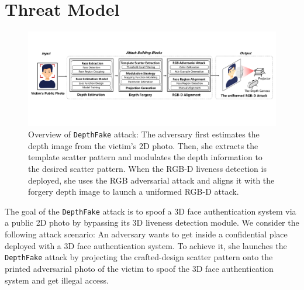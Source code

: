 
\section{Threat Model}


\begin{figure}[pt]
	\centerline{\includegraphics[width = \textwidth]{figures/overview_1.pdf}}
	\vspace{-0.1in}
	\caption{Overview of \texttt{DepthFake} attack: The adversary first estimates the depth image from the victim's 2D photo. Then, she extracts the template scatter pattern and modulates the depth information to the desired scatter pattern. When the RGB-D liveness detection is deployed, she uses the RGB adversarial attack and aligns it with the forgery depth image to launch a uniformed RGB-D attack.}
	\label{overview}
	\vspace{-0.15in}
\end{figure}

The goal of the \texttt{DepthFake} attack is to spoof a 3D face authentication system via a public 2D photo by bypassing its 3D liveness detection module. We consider the following attack scenario: An adversary wants to get inside a confidential place deployed with  a 3D face authentication system. To achieve it, she  launches the \texttt{DepthFake} attack by
projecting the crafted-design scatter pattern onto the printed adversarial photo of the victim to spoof the 3D face authentication system and get illegal access.
%
%


